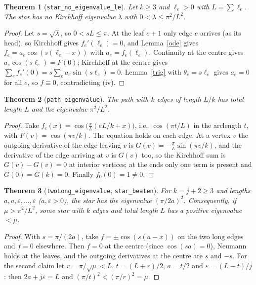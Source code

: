 \documentclass[11pt]{article}
\newtheorem{theorem}{Theorem}
\theoremstyle{definition}
\theoremstyle{remark}
\begin{document}
\begin{theorem}[\texttt{star\_no\_eigenvalue\_le}]\label{star}
Let $k\ge 3$ and $\ell_e>0$ with $L=\sum\ell_e$. The star has no Kirchhoff eigenvalue $\lambda$ with
$0<\lambda\le\pi^2/L^2$.
\end{theorem}
\begin{proof}
Let $s=\sqrt\lambda$, so $0<sL\le\pi$. At the leaf $e+1$ only edge $e$ arrives (as its head), so
Kirchhoff gives $f_e'(\ell_e)=0$, and Lemma~\ref{ode} gives $f_e=a_e\cos(s(\ell_e-x))$ with
$a_e=f_e(\ell_e)$. Continuity at the centre gives $a_e\cos(s\ell_e)=F(0)$; Kirchhoff at the centre
gives $\sum_e f_e'(0)=s\sum_e a_e\sin(s\ell_e)=0$. Lemma~\ref{trig} with $\theta_e=s\ell_e$ gives
$a_e=0$ for all $e$, so $f\equiv 0$, contradicting (iv).
\end{proof}

\begin{theorem}[\texttt{path\_eigenvalue}]
The path with $k$ edges of length $L/k$ has total length $L$ and the eigenvalue $\pi^2/L^2$.
\end{theorem}
\begin{proof}
Take $f_e(x)=\cos\big(\tfrac{\pi}{L}(eL/k+x)\big)$, i.e.\ $\cos(\pi t/L)$ in the arclength $t$, with
$F(v)=\cos(\pi v/k)$. The equation holds on each edge. At a vertex $v$ the outgoing derivative of
the edge leaving $v$ is $G(v)=-\tfrac{\pi}{L}\sin(\pi v/k)$, and the derivative of the edge arriving at
$v$ is $G(v)$ too, so the Kirchhoff sum is $G(v)-G(v)=0$ at interior vertices; at the ends only one
term is present and $G(0)=G(k)=0$. Finally $f_0(0)=1\ne 0$.
\end{proof}

\begin{theorem}[\texttt{twoLong\_eigenvalue}, \texttt{star\_beaten}]
For $k=j+2\ge 3$ and lengths $a,a,\varepsilon,\dots,\varepsilon$ ($a,\varepsilon>0$), the star has the
eigenvalue $(\pi/2a)^2$. Consequently, if $\mu>\pi^2/L^2$, some star with $k$ edges and total
length $L$ has a positive eigenvalue $<\mu$.
\end{theorem}
\begin{proof}
With $s=\pi/(2a)$, take $f=\pm\cos(s(a-x))$ on the two long edges and $f=0$ elsewhere. Then
$f=0$ at the centre (since $\cos(sa)=0$), Neumann holds at the leaves, and the outgoing derivatives
at the centre are $s$ and $-s$. For the second claim let $r=\pi/\sqrt\mu<L$, $t=(L+r)/2$, $a=t/2$
and $\varepsilon=(L-t)/j$: then $2a+j\varepsilon=L$ and $(\pi/t)^2<(\pi/r)^2=\mu$.
\end{proof}
\end{document}

